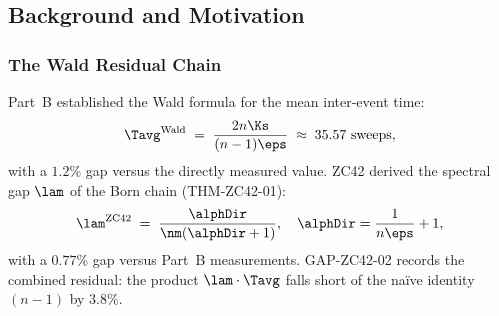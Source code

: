 \documentclass[12pt, a4paper]{article}
\begin{document}
\begin{abstract}
\sloppy
GAP-ZC42-02 records the Wald residual: the product
$\lambda_2\cdot T_{\rm avg}$ computed from the ZC42 formula and the
Wald formula for $T_{\rm avg}$ falls short of $(n-1)$ by $3.8\%$,
a discrepancy inherited from Part~B and unresolved through ZC49.

This paper makes partial progress. We derive an exact symbolic form
for the ZC42 product (LEM-ZC50-01), show it is a provable
\emph{lower bound} on the correct identity, and identify a
Near-Formal Candidate that narrows the gap from $3.8\%$ to
$0.25\%$:
\[
  \textbf{CONJ-ZC50-01:}\quad
  \lambda_2\cdot T_{\rm avg}
  \;=\; (n-1)\!\cdot\!\frac{2\nZft - 1}{2\nZft}
  \;=\; \frac{7\times 29}{30},
\]
where $\nZft = |\Zft| = 15$.

Three equivalent forms of the correction denominator
$2n_{\mathbb{Z}_{15}} = 30$ are identified:
the sector-boundary traversal form $n_m(n_m{+}1)$,
the CRF-constant form $2d_s n_m$,
and the primorial form $\text{Primorial}(n_m{=}5) = 2\cdot3\cdot5$.
A further gift (FIND-ZC50-01) emerges:
$\varphi(n_m(n_m{+}1)) = \varphi(n_{\mathbb{Z}_{15}}) = 8$,
because $n_m(n_m{+}1) = 2n_{\mathbb{Z}_{15}}$ and
$\varphi(2k)=\varphi(k)$ for odd $k$.
The $\mathbb{Z}_{15}$ totient thus hides inside the denominator
of the Wald correction, echoing the pattern of FIND-ZC49-04.

The algebraic derivation of the $1/(2d_s n_m)$ correction from
$\delta$-chain axioms remains open (GAP-ZC50-01); full closure of
GAP-ZC42-02 awaits ZC51+. Phase Misalignment PM-ZC50-01 records the
seed-42 outlier ($\lambda_2 = 0.1771$ vs mean $0.194$ over other
seeds), which may indicate a local Kuramoto attractor.
\end{abstract}

\subsection{Background and Motivation}

\subsubsection{The Wald Residual Chain}

Part~B established the Wald formula for the mean inter-event time:
\[
  \Tavg^{\rm Wald} \;=\; \frac{2n\Ks}{(n-1)\eps}
  \;\approx\; 35.57 \text{ sweeps},
\]
with a $1.2\%$ gap versus the directly measured value.
ZC42 derived the spectral gap $\lam$ of the Born chain
(THM-ZC42-01):
\[
  \lam^{\rm ZC42} \;=\; \frac{\alphDir}{\nm(\alphDir+1)},
  \quad \alphDir = \frac{1}{n\eps}+1,
\]
with a $0.77\%$ gap versus Part~B measurements.
GAP-ZC42-02 records the combined residual: the product
$\lam\cdot\Tavg$ falls short of the na\"ive identity
$(n-1)$ by $3.8\%$.
\end{document}
